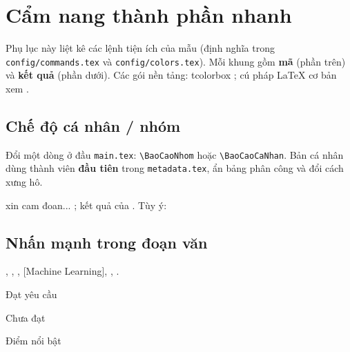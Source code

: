 \chapter{Cẩm nang thành phần nhanh}
\label{app:cam-nang}

Phụ lục này liệt kê các lệnh tiện ích của mẫu (định nghĩa trong
\texttt{config/commands.tex} và \texttt{config/colors.tex}). Mỗi khung gồm
\textbf{mã} (phần trên) và \textbf{kết quả} (phần dưới). Các gói nền tảng: tcolorbox
\cite{tcolorbox}; cú pháp LaTeX cơ bản xem \cite{lamport1994}.

\section{Chế độ cá nhân / nhóm}

Đổi một dòng ở đầu \texttt{main.tex}: \verb|\BaoCaoNhom| hoặc \verb|\BaoCaoCaNhan|.
Bản cá nhân dùng thành viên \textbf{đầu tiên} trong \texttt{metadata.tex}, ẩn bảng phân
công và đổi cách xưng hô.

\begin{vidulatex}
\ChungToi{} xin cam đoan... ; kết quả của \nhom{}.
Tùy ý: 
\end{vidulatex}

\section{Nhấn mạnh trong đoạn văn}

\begin{vidulatex}
, ,
, [Machine Learning],
  ,
    .
\end{vidulatex}

\begin{vidulatex}
\begin{dsdung} \item Đạt yêu cầu \end{dsdung}
\begin{dssai}  \item Chưa đạt     \end{dssai}
\begin{dssao}  \item Điểm nổi bật \end{dssao}
\end{vidulatex}

